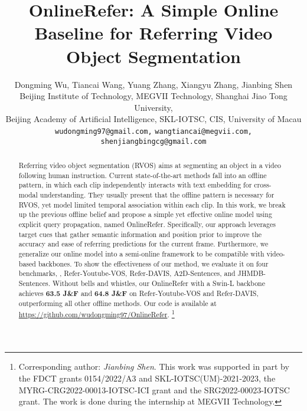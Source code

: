 \documentclass[10pt,twocolumn,letterpaper]{article}
\newcommand\blfootnote[1]{\begingroup
  \renewcommand\thefootnote{}\footnote{#1}\addtocounter{footnote}{-1}\endgroup
}
\begin{document}
\title{OnlineRefer: A Simple Online Baseline for Referring Video Object Segmentation}

\author{
Dongming Wu,
Tiancai Wang,
Yuang Zhang,
Xiangyu Zhang,
Jianbing Shen\\
 Beijing Institute of Technology,
 MEGVII Technology, 
 Shanghai Jiao Tong University,\\
 Beijing Academy of Artificial Intelligence,
 SKL-IOTSC, CIS, University of Macau \\
{\tt\small wudongming97@gmail.com,}
{\tt\small wangtiancai@megvii.com,}
{\tt\small shenjiangbingcg@gmail.com}
}

\maketitle
\ificcvfinal\thispagestyle{empty}\fi

\begin{abstract}

Referring video object segmentation (RVOS) aims at segmenting an object in a video following human instruction. Current state-of-the-art methods fall into an offline pattern, in which each clip independently interacts with text embedding for cross-modal understanding. They usually present that the offline pattern is necessary for RVOS, yet model limited temporal association within each clip. In this work, we break up the previous offline belief and propose a simple yet effective online model using explicit query propagation, named OnlineRefer. Specifically, our approach leverages target cues that gather semantic information and position prior to improve the accuracy and ease of referring predictions for the current frame. Furthermore, we generalize our online model into a semi-online framework to be compatible with video-based backbones. To show the effectiveness of our method, we evaluate it on four benchmarks, \ie, Refer-Youtube-VOS, Refer-DAVIS, A2D-Sentences, and JHMDB-Sentences.  Without bells and whistles, our OnlineRefer with a Swin-L backbone achieves\textbf{ 63.5 J\&F} and \textbf{64.8 J\&F} on Refer-Youtube-VOS and Refer-DAVIS, outperforming all other offline methods. Our code is available at \href{https://github.com/wudongming97/OnlineRefer}{https://github.com/wudongming97/OnlineRefer}.
\blfootnote{Corresponding author: \textit{Jianbing Shen}. This work was supported in part by the FDCT grants 0154/2022/A3 and SKL-IOTSC(UM)-2021-2023,
the MYRG-CRG2022-00013-IOTSC-ICI grant and the SRG2022-00023-IOTSC grant.
The work is done during the internship at MEGVII Technology.
}
 
\end{abstract}
\end{document}
